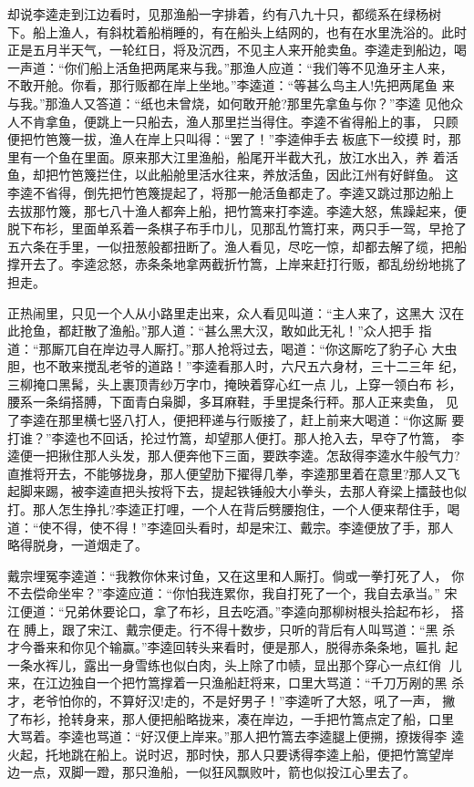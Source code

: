 却说李逵走到江边看时，见那渔船一字排着，约有八九十只，都缆系在绿杨树
下。船上渔人，有斜枕着船梢睡的，有在船头上结网的，也有在水里洗浴的。此时
正是五月半天气，一轮红日，将及沉西，不见主人来开舱卖鱼。李逵走到船边，喝
一声道：“你们船上活鱼把两尾来与我。”那渔人应道：“我们等不见渔牙主人来，
不敢开舱。你看，那行贩都在岸上坐地。”李逵道：“等甚么鸟主人!先把两尾鱼
来与我。”那渔人又答道：“纸也未曾烧，如何敢开舱?那里先拿鱼与你？”李逵
见他众人不肯拿鱼，便跳上一只船去，渔人那里拦当得住。李逵不省得船上的事，
只顾便把竹笆篾一拔，渔人在岸上只叫得：“罢了！”李逵伸手去板底下一绞摸
时，那里有一个鱼在里面。原来那大江里渔船，船尾开半截大孔，放江水出入，养
着活鱼，却把竹笆篾拦住，以此船舱里活水往来，养放活鱼，因此江州有好鲜鱼。
这李逵不省得，倒先把竹笆篾提起了，将那一舱活鱼都走了。李逵又跳过那边船上
去拔那竹篾，那七八十渔人都奔上船，把竹篙来打李逵。李逵大怒，焦躁起来，便
脱下布衫，里面单系着一条棋子布手巾儿，见那乱竹篙打来，两只手一驾，早抢了
五六条在手里，一似扭葱般都扭断了。渔人看见，尽吃一惊，却都去解了缆，把船
撑开去了。李逵忿怒，赤条条地拿两截折竹篙，上岸来赶打行贩，都乱纷纷地挑了
担走。

正热闹里，只见一个人从小路里走出来，众人看见叫道：“主人来了，这黑大
汉在此抢鱼，都赶散了渔船。”那人道：“甚么黑大汉，敢如此无礼！”众人把手
指道：“那厮兀自在岸边寻人厮打。”那人抢将过去，喝道：“你这厮吃了豹子心
大虫胆，也不敢来搅乱老爷的道路！”李逵看那人时，六尺五六身材，三十二三年
纪，三柳掩口黑髯，头上裹顶青纱万字巾，掩映着穿心红一点儿，上穿一领白布
衫，腰系一条绢搭膊，下面青白枭脚，多耳麻鞋，手里提条行秤。那人正来卖鱼，
见了李逵在那里横七竖八打人，便把秤递与行贩接了，赶上前来大喝道：“你这厮
要打谁？”李逵也不回话，抡过竹篙，却望那人便打。那人抢入去，早夺了竹篙，
李逵便一把揪住那人头发，那人便奔他下三面，要跌李逵。怎敌得李逵水牛般气力?
直推将开去，不能够拢身，那人便望肋下擢得几拳，李逵那里着在意里?那人又飞
起脚来踢，被李逵直把头按将下去，提起铁锤般大小拳头，去那人脊梁上擂鼓也似
打。那人怎生挣扎?李逵正打哩，一个人在背后劈腰抱住，一个人便来帮住手，喝
道：“使不得，使不得！”李逵回头看时，却是宋江、戴宗。李逵便放了手，那人
略得脱身，一道烟走了。

戴宗埋冤李逵道：“我教你休来讨鱼，又在这里和人厮打。倘或一拳打死了人，
你不去偿命坐牢？”李逵应道：“你怕我连累你，我自打死了一个，我自去承当。”
宋江便道：“兄弟休要论口，拿了布衫，且去吃酒。”李逵向那柳树根头拾起布衫，
搭在膊上，跟了宋江、戴宗便走。行不得十数步，只听的背后有人叫骂道：“黑
杀才今番来和你见个输赢。”李逵回转头来看时，便是那人，脱得赤条条地，匾扎
起一条水裈儿，露出一身雪练也似白肉，头上除了巾帻，显出那个穿心一点红俏
儿来，在江边独自一个把竹篙撑着一只渔船赶将来，口里大骂道：“千刀万剐的黑
杀才，老爷怕你的，不算好汉!走的，不是好男子！”李逵听了大怒，吼了一声，
撇了布衫，抢转身来，那人便把船略拢来，凑在岸边，一手把竹篙点定了船，口里
大骂着。李逵也骂道：“好汉便上岸来。”那人把竹篙去李逵腿上便搠，撩拨得李
逵火起，托地跳在船上。说时迟，那时快，那人只要诱得李逵上船，便把竹篙望岸
边一点，双脚一蹬，那只渔船，一似狂风飘败叶，箭也似投江心里去了。

